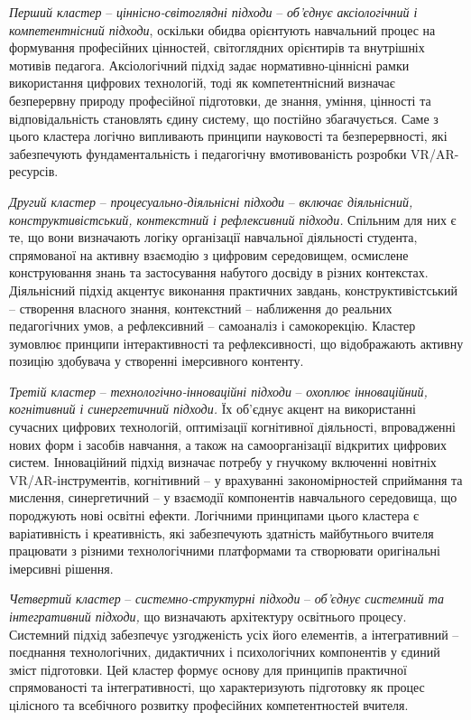 \emph{Перший кластер} -- \emph{ціннісно-світоглядні підходи} -- \emph{об'єднує аксіологічний і компетентнісний підходи}, оскільки обидва орієнтують навчальний процес на формування професійних цінностей, світоглядних орієнтирів та внутрішніх мотивів педагога. Аксіологічний підхід задає нормативно-ціннісні рамки використання цифрових технологій, тоді як компетентнісний визначає безперервну природу професійної підготовки, де знання, уміння, цінності та відповідальність становлять єдину систему, що постійно збагачується. Саме з цього кластера логічно випливають принципи науковості та безперервності, які забезпечують фундаментальність і педагогічну вмотивованість розробки VR/AR-ресурсів.

\emph{Другий кластер} -- \emph{процесуально-діяльнісні підходи} -- \emph{включає діяльнісний, конструктивістський, контекстний і рефлексивний підходи.} Спільним для них є те, що вони визначають логіку організації навчальної діяльності студента, спрямованої на активну взаємодію з цифровим середовищем, осмислене конструювання знань та застосування набутого досвіду в різних контекстах. Діяльнісний підхід акцентує виконання практичних завдань, конструктивістський -- створення власного знання, контекстний -- наближення до реальних педагогічних умов, а рефлексивний -- самоаналіз і самокорекцію. Кластер зумовлює принципи інтерактивності та рефлексивності, що відображають активну позицію здобувача у створенні імерсивного контенту.

\emph{Третій кластер} -- \emph{технологічно-інноваційні підходи} -- \emph{охоплює інноваційний, когнітивний і синергетичний підходи.} Їх об'єднує акцент на використанні сучасних цифрових технологій, оптимізації когнітивної діяльності, впровадженні нових форм і засобів навчання, а також на самоорганізації відкритих цифрових систем. Інноваційний підхід визначає потребу у гнучкому включенні новітніх VR/AR-інструментів, когнітивний -- у врахуванні закономірностей сприймання та мислення, синергетичний -- у взаємодії компонентів навчального середовища, що породжують нові освітні ефекти. Логічними принципами цього кластера є варіативність і креативність, які забезпечують здатність майбутнього вчителя працювати з різними технологічними платформами та створювати оригінальні імерсивні рішення.

\emph{Четвертий кластер} -- \emph{системно-структурні підходи} -- \emph{об'єднує системний та інтегративний підходи,} що визначають архітектуру освітнього процесу. Системний підхід забезпечує узгодженість усіх його елементів, а інтегративний -- поєднання технологічних, дидактичних і психологічних компонентів у єдиний зміст підготовки. Цей кластер формує основу для принципів практичної спрямованості та інтегративності, що характеризують підготовку як процес цілісного та всебічного розвитку професійних компетентностей вчителя.

